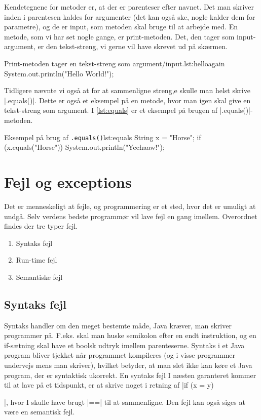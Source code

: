 {Kendetegnene for metoder er, at der er parenteser efter navnet. Det man skriver inden i parentesen kaldes for argumenter (det kan også ske, nogle kalder dem for parametre), og de er input, som metoden skal bruge til at arbejde med. En metode, som vi har set nogle gange, er print-metoden. Det, den tager som input-argument, er den tekst-streng, vi gerne vil have skrevet ud på skærmen.

\begin{JavaCode}{Print-metoden tager en tekst-streng som argument/input.}{lst:helloagain}
	System.out.println("Hello World!");
\end{JavaCode}

Tidligere nævnte vi også at for at sammenligne streng,e skulle man helst skrive \JavaInline|.equals()|. Dette er også et eksempel på en metode, hvor man igen skal give en tekst-streng som argument. I \autoref{lst:equals} er et eksempel på brugen af \JavaInline|.equals()|-metoden.

\begin{JavaCode}{Eksempel på brug af \texttt{.equals()}}{lst:equals}
	String x = "Horse";
	if (x.equals("Horse")) {
		System.out.println("Yeehaaw!");
	}
\end{JavaCode}

\section{Fejl og exceptions}
Det er menneskeligt at fejle, og programmering er et sted, hvor det er umuligt at undgå. Selv verdens bedste programmør vil lave fejl en gang imellem. Overordnet findes der tre typer fejl.

\begin{enumerate}
	\item Syntaks fejl
	\item Run-time fejl
	\item Semantiske fejl
\end{enumerate}

\subsection{Syntaks fejl}
Syntaks handler om den meget bestemte måde, Java kræver, man skriver programmer på. F.eks. skal man huske semikolon efter en endt instruktion, og en if-sætning skal have et boolsk udtryk imellem parenteserne. Syntaks i et Java program bliver tjekket når programmet kompileres (og i visse programmer undervejs mens man skriver), hvilket betyder, at man slet ikke kan køre et Java program, der er syntaktisk ukorrekt. En syntaks fejl I næsten garanteret kommer til at lave på et tidspunkt, er at skrive noget i retning af \JavaInline|if (x = y) {|, hvor I skulle have brugt \JavaInline|==| til at sammenligne. Den fejl kan også siges at være en semantisk fejl.

}}
